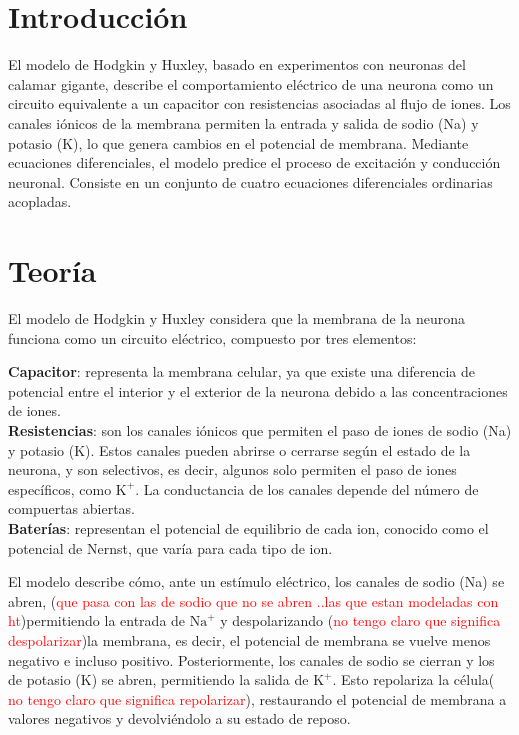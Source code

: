 \documentclass[aps,prl,twocolumn,groupedaddress]{revtex4-2}
\begin{document}
\section{Introducción}

El modelo de Hodgkin y Huxley, basado en experimentos con neuronas del calamar gigante, describe el comportamiento eléctrico de una neurona como un circuito equivalente a un capacitor con resistencias asociadas al flujo de iones. Los canales iónicos de la membrana permiten la entrada y salida de sodio (Na) y potasio (K), lo que genera cambios en el potencial de membrana. Mediante ecuaciones diferenciales, el modelo predice el proceso de excitación y conducción neuronal.
Consiste en un conjunto de cuatro ecuaciones diferenciales ordinarias acopladas.~\cite{HodgkinyHuxleyWikipedia}
\section{Teoría}

 El modelo de Hodgkin y Huxley considera que la membrana de la neurona funciona como un circuito eléctrico, compuesto por tres elementos:

\textbf{Capacitor}: representa la membrana celular, ya que existe una diferencia de potencial entre el interior y el exterior de la neurona debido a las concentraciones de iones.\\

\textbf{Resistencias}: son los canales iónicos que permiten el paso de iones de sodio (Na) y potasio (K). Estos canales pueden abrirse o cerrarse según el estado de la neurona, y son selectivos, es decir, algunos solo permiten el paso de iones específicos, como $\mathrm{K}^+$. La conductancia de los canales depende del número de compuertas abiertas.\\

\textbf{Baterías}: representan el potencial de equilibrio de cada ion, conocido como el potencial de Nernst, que varía para cada tipo de ion.

El modelo describe cómo, ante un estímulo eléctrico, los canales de sodio (Na) se abren, (\textcolor{red}{que pasa con las de sodio que no se abren ..las que estan modeladas con ht})permitiendo la entrada de $\mathrm{Na}^+$ y despolarizando (\textcolor{red}{no tengo claro que significa despolarizar})la membrana, es decir, el potencial de membrana se vuelve menos negativo e incluso positivo. Posteriormente, los canales de sodio se cierran y los de potasio (K) se abren, permitiendo la salida de $\mathrm{K}^+$. Esto repolariza la célula( \textcolor{red}{no tengo claro que significa repolarizar}), restaurando el potencial de membrana a valores negativos y devolviéndolo a su estado de reposo.
\end{document}
